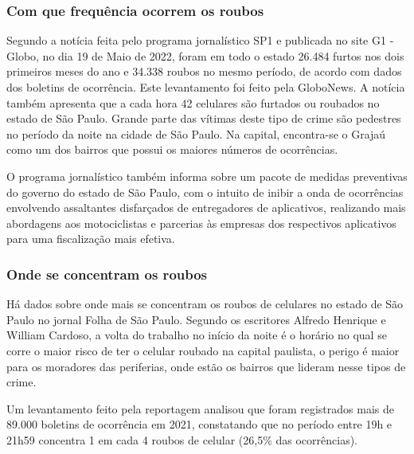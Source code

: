         \subsubsection{Com que frequência ocorrem os roubos}
        Segundo a notícia feita pelo programa jornalístico SP1 e publicada no site G1 - Globo,
        no dia 19 de Maio de 2022, foram em todo o estado 26.484 furtos nos dois primeiros 
        meses do ano e 34.338 roubos no mesmo período, de acordo com dados dos boletins de 
        ocorrência. Este levantamento foi feito pela GloboNews. A notícia também apresenta que
        a cada hora 42 celulares são furtados ou roubados no estado de São Paulo. Grande parte
        das vítimas deste tipo de crime são pedestres no período da noite na cidade de São Paulo.
        Na capital, encontra-se o Grajaú como um dos bairros que possui os maiores números de ocorrências.

        O programa jornalístico também informa sobre um pacote de medidas preventivas
        do governo do estado de São Paulo, com o intuito de inibir a onda de ocorrências
        envolvendo assaltantes disfarçados de entregadores de aplicativos, realizando mais
        abordagens aos motociclistas e parcerias às empresas dos respectivos aplicativos para
        uma fiscalização mais efetiva.

        \subsubsection{Onde se concentram os roubos}
        Há dados sobre onde mais se concentram os roubos de celulares no estado de São 
        Paulo no jornal Folha de São Paulo. Segundo os escritores Alfredo Henrique e William
        Cardoso, a volta do trabalho no início da noite é o horário no qual se corre o maior
        risco de ter o celular roubado na capital paulista, o perigo é maior para os moradores
        das periferias, onde estão os bairros que lideram nesse tipos de crime.

        Um levantamento feito pela reportagem analisou que foram registrados mais de 89.000
        boletins de ocorrência em 2021, constatando que no período entre 19h e 21h59 concentra
        1 em cada 4 roubos de celular (26,5\% das ocorrências).
        
